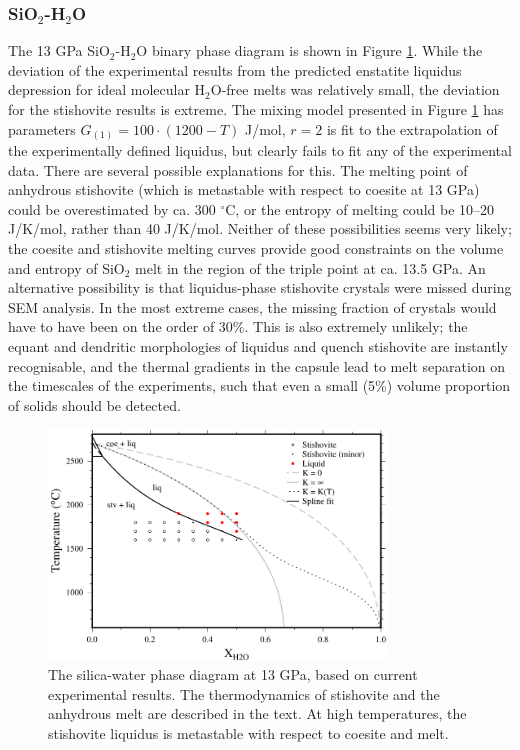 \documentclass[review]{elsarticle}
\begin{document}
\subsubsection{SiO$_2$-H$_2$O}
The 13 GPa SiO$_2$-H$_2$O binary phase diagram is shown in Figure \ref{fig:SH}. While the deviation of the experimental results from the predicted enstatite liquidus depression for ideal molecular H$_2$O-free melts was relatively small, the deviation for the stishovite results is extreme. The mixing model presented in Figure \ref{fig:SH} has parameters $G_{(1)} = 100 \cdot (1200-T)$ J/mol, $r=2$ is fit to the extrapolation of the experimentally defined liquidus, but clearly fails to fit any of the experimental data. There are several possible explanations for this. The melting point of anhydrous stishovite (which is metastable with respect to coesite at 13 GPa) could be overestimated by ca. 300 $^{\circ}$C, or the entropy of melting could be 10--20 J/K/mol, rather than 40 J/K/mol. Neither of these possibilities seems very likely; the coesite and stishovite melting curves \citep{ZLGHF1993} provide good constraints on the volume and entropy of SiO$_2$ melt in the region of the triple point at ca. 13.5 GPa. An alternative possibility is that liquidus-phase stishovite crystals were missed during SEM analysis. In the most extreme cases, the missing fraction of crystals would have to have been on the order of 30\%. This is also extremely unlikely; the equant and dendritic morphologies of liquidus and quench stishovite are instantly recognisable, and the thermal gradients in the capsule lead to melt separation on the timescales of the experiments, such that even a small (5\%) volume proportion of solids should be detected.

\begin{figure}[ht!]
  \centering
      \includegraphics[width=0.8\textwidth]{figures/stishovite}
      \caption{The silica-water phase diagram at 13 GPa, based on current experimental results. The thermodynamics of stishovite and the anhydrous melt are described in the text. At high temperatures, the stishovite liquidus is metastable with respect to coesite and melt.}
  \label{fig:SH}
\end{figure}
\end{document}
